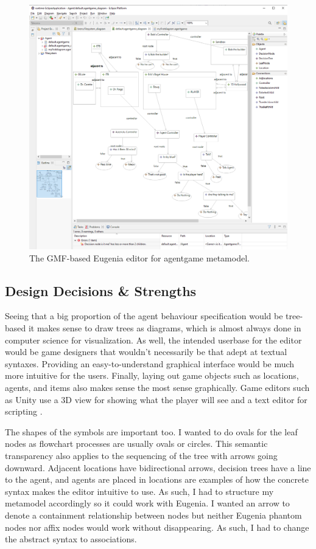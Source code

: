 \documentclass[letterpaper,12pt]{article}  %
\begin{document}
\begin{figure}[h]  %
    \centering  %
    \includegraphics[width = 13 cm ]{Final Editor.png}
    \caption{The GMF-based Eugenia editor for agentgame metamodel.}
    \label{fig:editor}
\end{figure}

\subsection{Design Decisions & Strengths}
Seeing that a big proportion of the agent behaviour specification would be tree-based it makes sense to draw trees as diagrams, which is almost always done in computer science for visualization. As well, the intended userbase for the editor would be game designers that wouldn’t necessarily be that adept at textual syntaxes. Providing an easy-to-understand graphical interface would be much more intuitive for the users. Finally, laying out game objects such as locations, agents, and items also makes sense the most sense graphically. Game editors such as Unity use a 3D view for showing what the player will see and a text editor for scripting \cite{technologies_unity_nodate}.

The shapes of the symbols are important too. I wanted to do ovals for the leaf nodes as flowchart processes are usually ovals or circles. This semantic transparency also applies to the sequencing of the tree with arrows going downward. Adjacent locations have bidirectional arrows, decision trees have a line to the agent, and agents are placed in locations are examples of how the concrete syntax makes the editor intuitive to use. As such, I had to structure my metamodel accordingly so it could work with Eugenia. I wanted an arrow to denote a containment relationship between nodes but neither Eugenia phantom nodes nor affix nodes would work without disappearing. As such, I had to change the abstract syntax to associations.
\end{document}
